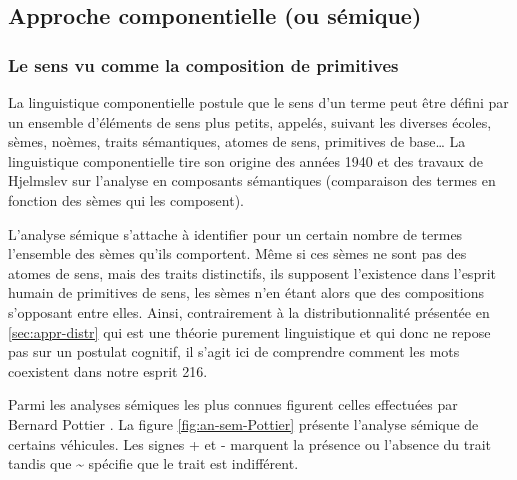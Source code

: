 {%
%  

\subsection{Approche componentielle (ou sémique)}\label{sec:appr-componentielle}

\subsubsection{Le sens vu comme la composition de primitives}
\label{sec:sens-vu-primitives}

La linguistique componentielle postule que le sens d'un terme peut
être défini par un ensemble d'éléments de sens plus petits, appelés, suivant les
diverses écoles, sèmes, noèmes, traits
sémantiques, atomes de sens, primitives de base\ldots 
La linguistique componentielle tire son origine des années 1940 et des
travaux de Hjelmslev \cite{Hjelmslev1968} sur l'analyse en composants sémantiques (comparaison des termes en fonction des sèmes qui les composent).

L'analyse sémique s'attache à identifier pour un certain nombre de
termes l'ensemble des sèmes qu'ils
comportent.  Même si ces sèmes ne sont pas des atomes de
sens, mais des traits distinctifs, ils supposent
l'existence dans l'esprit humain de primitives de sens, les sèmes n'en
étant alors que des compositions s'opposant entre elles.  Ainsi,
contrairement à la distributionnalité présentée en
\ref{sec:appr-distr} qui est une théorie purement linguistique et qui
donc ne repose pas sur un postulat cognitif, il s'agit ici de
comprendre comment les mots coexistent dans notre esprit
\citep{Nyckees1998}{216}.

Parmi les analyses sémiques les plus connues figurent celles
effectuées par Bernard Pottier \cite{Pottier1964}. La figure
\ref{fig:an-sem-Pottier} présente l'analyse sémique de certains
véhicules. Les signes + et - marquent la présence ou l'absence du
trait tandis que \~{} spécifie que le trait est indifférent.

}
